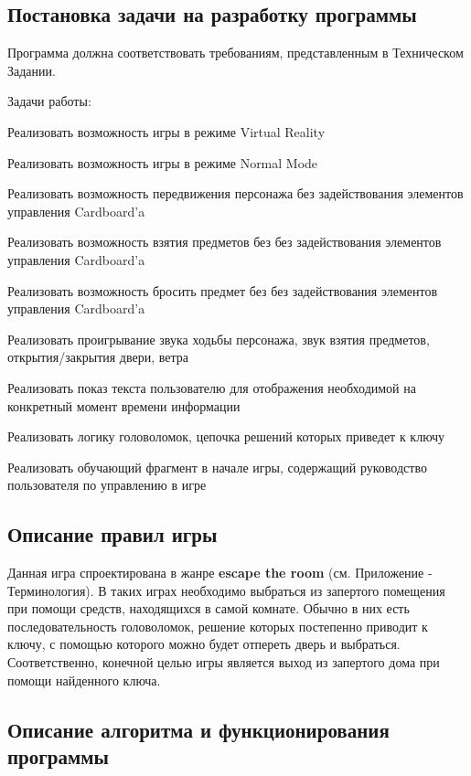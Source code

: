 \subsection{Постановка задачи на разработку программы}
\tab[0.75cm]Программа должна соответствовать требованиям, представленным в 
Техническом 
Задании.

\bigskip
Задачи работы:

\smallskip
\begin{my_enumerate}
\item Реализовать возможность игры в режиме Virtual Reality
\item Реализовать возможность игры в режиме Normal Mode
\item Реализовать возможность передвижения персонажа без задействования 
элементов управления Cardboard'a
\item Реализовать возможность взятия предметов без без задействования 
элементов управления Cardboard'a
\item Реализовать возможность бросить предмет без без задействования 
элементов управления Cardboard'a
\item Реализовать проигрывание звука ходьбы персонажа, звук взятия предметов, 
открытия/закрытия двери, ветра
\item Реализовать показ текста пользователю для отображения необходимой на 
конкретный момент времени информации
\item Реализовать логику головоломок, цепочка решений которых приведет к ключу
\item Реализовать обучающий фрагмент в начале игры, содержащий руководство 
пользователя по управлению в игре
\end{my_enumerate}


\subsection{Описание правил игры}

\tab[0.75cm]Данная игра спроектирована в жанре \textbf{escape the room} (см. 
Приложение - 
Терминология). В таких играх необходимо выбраться из запертого помещения при 
помощи средств, находящихся в самой комнате. Обычно в них есть 
последовательность головоломок, решение которых постепенно приводит к ключу, с 
помощью которого можно будет отпереть дверь и выбраться. Соответственно, 
конечной целью игры является выход из запертого дома при помощи найденного 
ключа.

\subsection{Описание алгоритма и функционирования программы}

